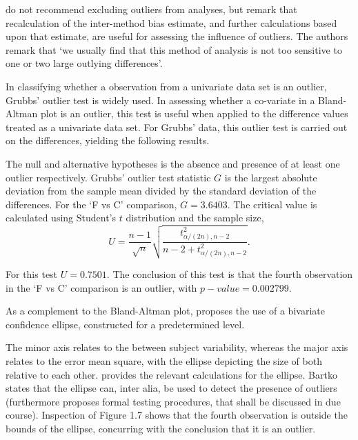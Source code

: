 \documentclass[Main.tex]{subfiles}
\begin{document}
	
	\citet*{BA99} do not recommend excluding outliers from analyses,
	but remark that recalculation of the inter-method bias estimate,
	and further calculations based upon that estimate, are useful for
	assessing the influence of outliers. The authors remark that `we
	usually find that this method of analysis is not too sensitive to
	one or two large outlying differences'.
	
	
	
	In classifying whether a observation from a univariate data set is
	an outlier, Grubbs' outlier test is widely used. In assessing
	whether a co-variate in a Bland-Altman plot is an outlier, this
	test is useful when applied to the difference values treated as a
	univariate data set. For Grubbs' data, this outlier test is
	carried out on the differences, yielding the following results.
	
	The null and alternative hypotheses is the absence and presence of
	at least one outlier respectively. Grubbs' outlier test statistic
	$G$ is the largest absolute deviation from the sample mean divided
	by the standard deviation of the differences. For the `F vs C'
	comparison, $G = 3.6403$. The critical value is calculated using
	Student's $t$ distribution and the sample size,
	\begin{equation}
	U = \frac{n-1}{\sqrt{n}} \sqrt{\frac{t_{\alpha/(2n),n-2}^2}{n - 2
			+ t_{\alpha/(2n),n-2}^2}}.
	\end{equation}
	
	For this test $U = 0.7501$. The conclusion of this test is that
	the fourth observation in the `F vs C' comparison is an outlier,
	with $p-value = 0.002799$.
	
	As a complement to the Bland-Altman plot, \citet{Bartko} proposes
	the use of a bivariate confidence ellipse, constructed for a
	predetermined level.
	
	The minor axis relates to the between subject variability, whereas the major axis relates to the error mean square, with the ellipse
	depicting the size of both relative to each	other.\citet{AltmanEllipse} provides the relevant calculations for
	the ellipse. Bartko states that the ellipse can, inter alia, be
	used to detect the presence of outliers (furthermore \citet{Bartko} proposes formal testing procedures, that shall be
	discussed in due course). Inspection of Figure 1.7 shows that the
	fourth observation is outside the bounds of the ellipse, concurring with the conclusion that it is an outlier.
	
\end{document}
